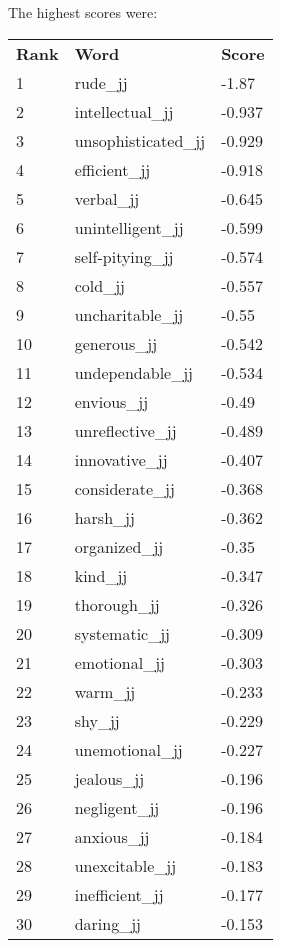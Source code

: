 \documentclass[10pt,letterpaper]{book}
\begin{document}
The highest scores were:
\begin{tabular}{ l l l }
        \textbf{Rank} & \textbf{Word} & \textbf{Score} \\
        1 & rude\_jj & -1.87 \\
        2 & intellectual\_jj & -0.937 \\
        3 & unsophisticated\_jj & -0.929 \\
        4 & efficient\_jj & -0.918 \\
        5 & verbal\_jj & -0.645 \\
        6 & unintelligent\_jj & -0.599 \\
        7 & self-pitying\_jj & -0.574 \\
        8 & cold\_jj & -0.557 \\
        9 & uncharitable\_jj & -0.55 \\
        10 & generous\_jj & -0.542 \\
        11 & undependable\_jj & -0.534 \\
        12 & envious\_jj & -0.49 \\
        13 & unreflective\_jj & -0.489 \\
        14 & innovative\_jj & -0.407 \\
        15 & considerate\_jj & -0.368 \\
        16 & harsh\_jj & -0.362 \\
        17 & organized\_jj & -0.35 \\
        18 & kind\_jj & -0.347 \\
        19 & thorough\_jj & -0.326 \\
        20 & systematic\_jj & -0.309 \\
        21 & emotional\_jj & -0.303 \\
        22 & warm\_jj & -0.233 \\
        23 & shy\_jj & -0.229 \\
        24 & unemotional\_jj & -0.227 \\
        25 & jealous\_jj & -0.196 \\
        26 & negligent\_jj & -0.196 \\
        27 & anxious\_jj & -0.184 \\
        28 & unexcitable\_jj & -0.183 \\
        29 & inefficient\_jj & -0.177 \\
        30 & daring\_jj & -0.153 \\
\end{tabular}
\end{document}
